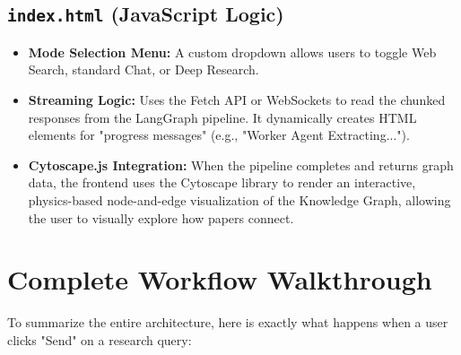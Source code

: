 \documentclass[12pt, a4paper]{report}
\begin{document}
\section{\texttt{index.html} (JavaScript Logic)}
\begin{itemize}
    \item \textbf{Mode Selection Menu:} A custom dropdown allows users to toggle Web Search, standard Chat, or Deep Research.
    \item \textbf{Streaming Logic:} Uses the Fetch API or WebSockets to read the chunked responses from the LangGraph pipeline. It dynamically creates HTML elements for "progress messages" (e.g., "Worker Agent Extracting...").
    \item \textbf{Cytoscape.js Integration:} When the pipeline completes and returns graph data, the frontend uses the Cytoscape library to render an interactive, physics-based node-and-edge visualization of the Knowledge Graph, allowing the user to visually explore how papers connect.
\end{itemize}

\newpage

\chapter{Complete Workflow Walkthrough}

To summarize the entire architecture, here is exactly what happens when a user clicks "Send" on a research query:
\end{document}
